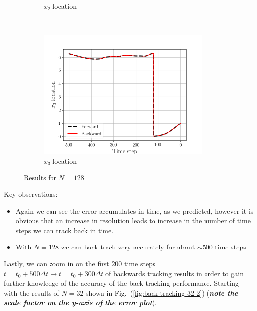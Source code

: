 \begin{figure}[H]
\begin{subfigure}[H]{0.45\textwidth}
        \caption{$x_{2}$ location}
    \end{subfigure}
    ~
    \begin{subfigure}[H]{0.45\textwidth}
        \includegraphics[height=2.5in]{media/rk4/run-128/x3-128-tracking.png}
        \caption{$x_{3}$ location}
    \end{subfigure}
    \caption{Results for $N=128$}
    \label{fig:back-tracking-128}
\end{figure}
Key observations:
\begin{itemize}
    \item Again we can see the error accumulates in time, as we predicted,
            however it is obvious that an increase in resolution leads to
            increase in the number of time steps we can track back in time. 
    \item With $N=128$ we can back track very accurately for about $\sim 500$
        time steps.
\end{itemize}
\newpage
Lastly, we can zoom in on the first $200$ time steps $t=t_{0}+500\Delta t
\rightarrow t = t_{0} + 300\Delta t$ of backwards tracking results in order
to gain further knowledge of the accuracy of the back tracking performance.
Starting with the results of $N=32$ shown in
Fig.~(\ref{fig:back-tracking-32-2}) (\emph{\textbf{note the scale factor on the
y-axis of the error plot}}).
